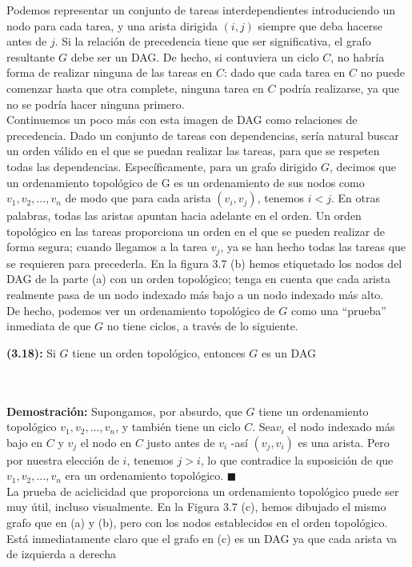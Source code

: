 \documentclass[a4paper, 12pt]{book}
\theoremstyle{dotless}
\begin{document}
Podemos representar un conjunto de tareas interdependientes introduciendo un nodo para cada tarea, y una arista dirigida $(i, j)$ siempre que deba hacerse antes de $j$. Si la relación de precedencia tiene que ser significativa, el grafo resultante $G$ debe ser un DAG. De hecho, si contuviera un ciclo $C$, no habría forma de realizar ninguna de las tareas en $C$: dado que cada tarea en $C$ no puede comenzar hasta que otra complete, ninguna tarea en $C$ podría realizarse, ya que no se podría hacer ninguna primero.\\

Continuemos un poco más con esta imagen de DAG como relaciones de precedencia. Dado un conjunto de tareas con dependencias, sería natural buscar un orden válido en el que se puedan realizar las tareas, para que se respeten todas las dependencias. Específicamente, para un grafo dirigido $G$, decimos que un ordenamiento topológico de G es un ordenamiento de sus nodos como $v_1, v_2, ..., v_n$ de modo que para cada arista $(v_i, v_j)$, tenemos $i <j$. En otras palabras, todas las aristas apuntan hacia adelante en el orden. Un orden topológico en las tareas proporciona un orden en el que se pueden realizar de forma segura; cuando llegamos a la tarea $v_j$, ya se han hecho todas las tareas que se requieren para precederla. En la figura 3.7 (b) hemos etiquetado los nodos del DAG de la parte (a) con un orden topológico; tenga en cuenta que cada arista realmente pasa de un nodo indexado más bajo a un nodo indexado más alto.\\

De hecho, podemos ver un ordenamiento topológico de $G$ como una ``prueba'' inmediata de que $G$ no tiene ciclos, a través de lo siguiente.\\

 \colorbox{mygray}{\parbox{15cm}{
	\textbf{(3.18):} Si $G$ tiene un orden topológico, entonces $G$ es un DAG}}\\\\

\textbf{Demostración:} Supongamos, por absurdo, que $G$ tiene un ordenamiento topológico $v_1, v_2, ..., v_n$, y también tiene un ciclo $C$. Sea$v_i$ el nodo indexado más bajo en $C$ y $v_j$ el nodo en $C$ justo antes de $v_i$ -así $(v_j, v_i)$ es una arista. Pero por nuestra elección de $i$, tenemos $j> i$, lo que contradice la suposición de que $v_1, v_2, ..., v_n$ era un ordenamiento topológico. $\blacksquare$\\

La prueba de aciclicidad que proporciona un ordenamiento topológico puede ser muy útil, incluso visualmente. En la Figura 3.7 (c), hemos dibujado el mismo grafo que en (a) y (b), pero con los nodos establecidos en el orden topológico. Está inmediatamente claro que el grafo en (c) es un DAG ya que cada arista va de izquierda a derecha\\
\end{document}
